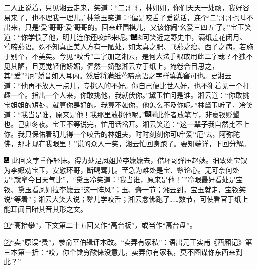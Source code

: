 二人正说着，只见湘云走来，笑道：``二哥哥，林姐姐，你们天天一处顽，我好容易来了，也不理我一理儿。''林黛玉笑道：``偏是咬舌子爱说话，连个`二'哥哥也叫不出来，只是`爱'哥哥`爱'哥哥的。回来赶围棋儿，又该你闹`幺爱三四五'了。''宝玉笑道：``你学惯了他，明儿连你还咬起来呢。''{\includegraphics[width=3mm]{../Images/00003}\includegraphics[width=3mm]{../Images/00012}\footnotesize \kaishu 可笑近之野史中，满纸羞花闭月、莺啼燕语。殊不知真正美人方有一陋处，如太真之肥、飞燕之瘦、西子之病，若施于别个，不美矣。今见``咬舌''二字加之湘云，是何大法手眼敢用此二字哉？不独不见其陋，且更觉轻俏娇媚，俨然一娇憨湘云立于纸上，掩卷合目思之，其``爱''``厄''娇音如入耳内。然后将满纸莺啼燕语之字样填粪窖可也。}史湘云道：``他再不放人一点儿，专挑人的不好。你自己便比世人好，也不犯着见一个打趣一个。指出一个人来，你敢挑他，我就伏你。''黛玉忙问是谁。湘云道：``你敢挑宝姐姐的短处，就算你是好的。我算不如你，他怎么不及你呢。''林黛玉听了，冷笑道：``我当是谁，原来是他！我那里敢挑他呢。''{\includegraphics[width=3mm]{../Images/00004}\includegraphics[width=3mm]{../Images/00010}\footnotesize \kaishu 此作者放笔写，非褒钗贬颦也。己卯冬夜。}宝玉不等说完，忙用话岔开。湘云笑道：``这一辈子我自然比不上你。我只保佑着明儿得一个咬舌的林姐夫，时时刻刻你可听`爱'`厄'去。阿弥陀佛，那才现在我眼里！''说的众人一笑，湘云忙回身跑了。要知端详，下回分解。

{\includegraphics[width=3mm]{../Images/00003}  \kaishu 此回文字重作轻抹。得力处是凤姐拉李嬷嬷去，借环哥弹压赵姨。细致处宝钗为李嬷劝宝玉，安慰环哥，断喝莺儿。至急为难处是宝、颦论心。无可奈何处是``就拿今日天气比''，``黛玉冷笑道：`我当谁，原来是他！'''冷眼最好看处是宝钗、黛玉看凤姐拉李嬷云``这一阵风''；玉、麝一节；湘云到，宝玉就走，宝钗笑说``等着''；湘云大笑大说；颦儿学咬舌；湘云念佛跑了\ldots{}\ldots{}数节，可使看官于纸上能耳闻目睹其音其形之文。}

{\href{../Text/part0024_split_000.html\#navto_1_a}{①}``高抬攀''，下文第二十五回又作``高台板''，或当作``高台盘''。}

{\href{../Text/part0024_split_000.html\#navto_2_a}{②}``卖''原误``费''，参俞平伯辑评本改。``卖弄有家私''：语出元王实甫《西厢记》第三本第一折：``哎，你个馋穷酸俫没意儿，卖弄你有家私，莫不图谋你东西来到此？''}
